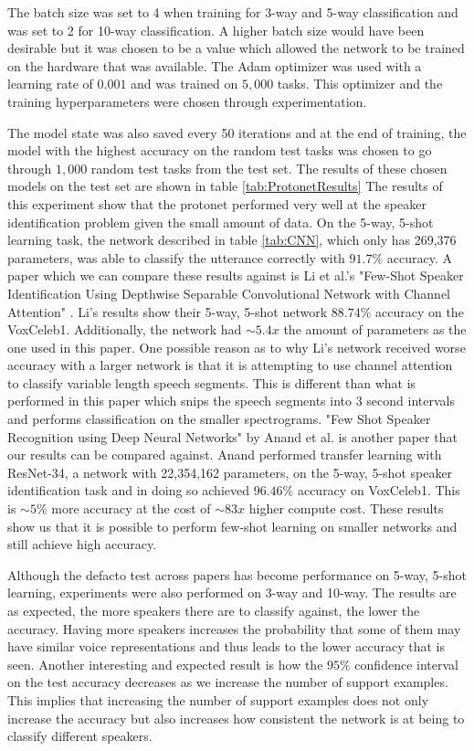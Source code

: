 \documentclass{article}
\begin{document}
The batch size was set to 4 when training for 3-way and 5-way classification and was set to 2 for 10-way classification.
A higher batch size would have been desirable but it was chosen to be a value which allowed the network to be trained on
the hardware that was available. The Adam optimizer was used with a learning rate of $0.001$ and was trained on $5,000$ 
tasks. This optimizer and the training hyperparameters were chosen through experimentation.

The model state was also saved every 50 iterations and at the end of training, the model with the highest accuracy on 
the random test tasks was chosen to go through $1,000$ random test tasks from the test set. The results of these chosen models
on the test set are shown in table \ref{tab:ProtonetResults} The results of this experiment show that the protonet 
performed very well at the speaker identification problem given the small amount of data. On the 5-way, 5-shot learning task,
the network described in table \ref{tab:CNN}, which only has 269,376 parameters, was able to classify the utterance correctly
with $91.7\%$ accuracy. A paper which we can compare these results against is Li et al.'s "Few-Shot Speaker Identification Using Depthwise Separable Convolutional Network with Channel Attention"
\cite{FewShotSpeakerIDChannelAttention}. Li's results show their 5-way, 5-shot network $88.74\%$ accuracy on the VoxCeleb1.
Additionally, the network had $\sim5.4x$ the amount of parameters as the one used in this paper. One possible reason as 
to why Li's network received worse accuracy with a larger network is that it is attempting to use channel attention to classify
variable length speech segments. This is different than what is performed in this paper which snips the speech segments into 
3 second intervals and performs classification on the smaller spectrograms. "Few Shot Speaker Recognition using Deep Neural Networks" \cite{FewShotSpeakerRecognition}
by Anand et al. is another paper that our results can be compared against. Anand performed transfer learning with ResNet-34, a
network with 22,354,162 parameters, on the 5-way, 5-shot speaker identification task and in doing so achieved $96.46\%$ accuracy
on VoxCeleb1. This is $\sim5\%$ more accuracy at the cost of $\sim83x$ higher compute cost. These results show us that it
is possible to perform few-shot learning on smaller networks and still achieve high accuracy.

Although the defacto test across papers has become performance on 5-way, 5-shot learning, experiments were also performed
on 3-way and 10-way. The results are as expected, the more speakers there are to classify against, the lower the accuracy.
Having more speakers increases the probability that some of them may have similar voice representations and thus leads to
the lower accuracy that is seen. Another interesting and expected result is how the $95\%$ confidence interval on the test
accuracy decreases as we increase the number of support examples. This implies that increasing the number of support examples
does not only increase the accuracy but also increases how consistent the network is at being to classify different speakers.
\end{document}
